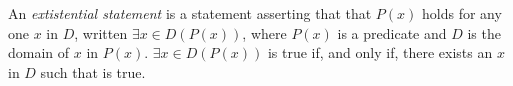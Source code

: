 \guard





\begin{defn}
\label{defn:extistentialStatement}
	An \emph{extistential statement} is a statement asserting that that $P(x)$ holds for any one $x$ in $D$, written $\exists x\in D(P(x))$, where  $P(x)$ is a predicate and $D$ is the domain of $x$ in $P(x)$.
	$\exists x\in D(P(x))$ is true if, and only if, there exists an $x$ in $D$ such that is true.
\end{defn}
